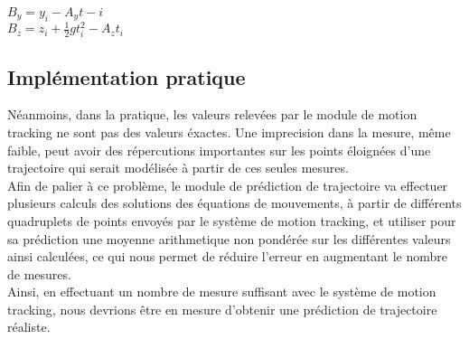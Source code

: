 $B_y = y_i - A_y t-i$\\

$B_z = z_i + \frac{1}{2} g t_i^2 - A_z t_i$\\

\subsection{Implémentation pratique}

Néanmoins, dans la pratique, les valeurs relevées par le module de motion tracking ne sont pas des valeurs éxactes. Une imprecision dans la mesure, même faible, peut avoir des répercutions importantes sur les points éloignées d'une trajectoire qui serait modélisée à partir de ces seules mesures.\\

Afin de palier à ce problème, le module de prédiction de trajectoire va effectuer plusieurs calculs des solutions des équations de mouvements, à partir de différents quadruplets de points envoyés par le système de motion tracking, et utiliser pour sa prédiction une moyenne arithmetique non pondérée sur les différentes valeurs ainsi calculées, ce qui nous permet de réduire l'erreur en augmentant le nombre de mesures. \\

Ainsi, en effectuant un nombre de mesure suffisant avec le système de motion tracking, nous devrions être en mesure d'obtenir une prédiction de trajectoire réaliste.
\newpage
